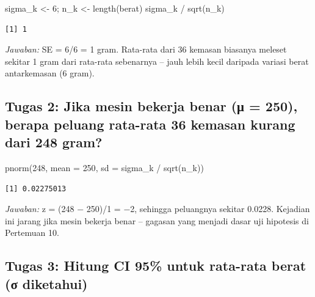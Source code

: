 \documentclass[
  indonesian,
  letterpaper,
]{book}
\newenvironment{Shaded}{\begin{snugshade}}{\end{snugshade}}
\newcommand{\AttributeTok}[1]{\textcolor[rgb]{0.40,0.45,0.13}{#1}}
\newcommand{\DecValTok}[1]{\textcolor[rgb]{0.68,0.00,0.00}{#1}}
\newcommand{\FunctionTok}[1]{\textcolor[rgb]{0.28,0.35,0.67}{#1}}
\newcommand{\NormalTok}[1]{\textcolor[rgb]{0.00,0.23,0.31}{#1}}
\newcommand{\OtherTok}[1]{\textcolor[rgb]{0.00,0.23,0.31}{#1}}
\newcommand{\SpecialCharTok}[1]{\textcolor[rgb]{0.37,0.37,0.37}{#1}}
\begin{document}
\begin{Shaded}
\begin{Highlighting}[]
\NormalTok{sigma\_k }\OtherTok{\textless{}{-}} \DecValTok{6}\NormalTok{; n\_k }\OtherTok{\textless{}{-}} \FunctionTok{length}\NormalTok{(berat)}
\NormalTok{sigma\_k }\SpecialCharTok{/} \FunctionTok{sqrt}\NormalTok{(n\_k)}
\end{Highlighting}
\end{Shaded}

\begin{verbatim}
[1] 1
\end{verbatim}

\emph{Jawaban:} SE = 6/6 = 1 gram. Rata-rata dari 36 kemasan biasanya
meleset sekitar 1 gram dari rata-rata sebenarnya -- jauh lebih kecil
daripada variasi berat antarkemasan (6 gram).

\subsection{Tugas 2: Jika mesin bekerja benar (μ = 250), berapa peluang
rata-rata 36 kemasan kurang dari 248
gram?}\label{tugas-2-jika-mesin-bekerja-benar-ux3bc-250-berapa-peluang-rata-rata-36-kemasan-kurang-dari-248-gram}

\begin{Shaded}
\begin{Highlighting}[]
\FunctionTok{pnorm}\NormalTok{(}\DecValTok{248}\NormalTok{, }\AttributeTok{mean =} \DecValTok{250}\NormalTok{, }\AttributeTok{sd =}\NormalTok{ sigma\_k }\SpecialCharTok{/} \FunctionTok{sqrt}\NormalTok{(n\_k))}
\end{Highlighting}
\end{Shaded}

\begin{verbatim}
[1] 0.02275013
\end{verbatim}

\emph{Jawaban:} z = (248 − 250)/1 = −2, sehingga peluangnya sekitar
0.0228. Kejadian ini jarang jika mesin bekerja benar -- gagasan yang
menjadi dasar uji hipotesis di Pertemuan 10.

\subsection{Tugas 3: Hitung CI 95\% untuk rata-rata berat (σ
diketahui)}\label{tugas-3-hitung-ci-95-untuk-rata-rata-berat-ux3c3-diketahui}
\end{document}
